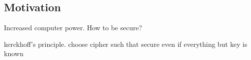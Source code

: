 
\subsection{Motivation}

Increased computer power. How to be secure?


kerckhoff's principle. choose cipher such that secure even if everything but key is known

